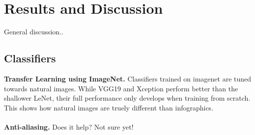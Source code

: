 \section{Results and Discussion}

General discussion..

\subsection{Classifiers}

\textbf{Transfer Learning using ImageNet.} Classifiers trained on imagenet are tuned towards natural images. While VGG19 and Xception perform better than the shallower LeNet, their full performance only develops when training from scratch. This shows how natural images are truely different than infographics.
\\~\\
\textbf{Anti-aliasing.} Does it help? Not sure yet!




%
%
%
%
%
%
%


